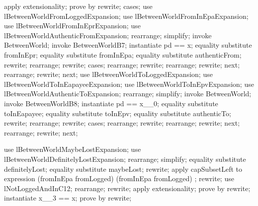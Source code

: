 \begin{LPScript}\begin{zproof}[lNotLoggedAndInC12]
    apply extensionality;
    prove by rewrite;
    cases;
        use lBetweenWorldFromLoggedExpansion;
        use lBetweenWorldFromInEpaExpansion;
        use lBetweenWorldFromInEprExpansion;
        use lBetweenWorldAuthenticFromExpansion;
        rearrange;
        simplify;
        invoke BetweenWorld;
        invoke BetweenWorldB7;
        instantiate pd == x;
        equality substitute fromInEpr;
        equality substitute fromInEpa;
        equality substitute authenticFrom;
        rewrite;
        rearrange;
        rewrite;
        cases;
            rearrange;
            rewrite;
            rearrange;
            rewrite;
        next;
            rearrange;
            rewrite;
    next;
        use lBetweenWorldToLoggedExpansion;
        use lBetweenWorldToInEapayeeExpansion;
        use lBetweenWorldToInEpvExpansion;
        use lBetweenWorldAuthenticToExpansion;
        rearrange;
        simplify;
        invoke BetweenWorld;
        invoke BetweenWorldB8;
        instantiate pd == x\_\_0;
        equality substitute toInEapayee;
        equality substitute toInEpv;
        equality substitute authenticTo;
        rewrite;
        rearrange;
        rewrite;
        cases;
            rearrange;
            rewrite;
            rearrange;
            rewrite;
        next;
            rearrange;
            rewrite;
    next;
\end{zproof}\end{LPScript}

\begin{LPScript}\begin{zproof}[lLostC13]
    use lBetweenWorldMaybeLostExpansion;
    use lBetweenWorldDefinitelyLostExpansion;
    rearrange;
    simplify;
    equality substitute definitelyLost;
    equality substitute maybeLost;
    rewrite;
    apply capSubsetLeft to expression (fromInEpa \cup fromLogged) \cap
        (fromInEpa \cup fromLogged) ;
    rewrite;
    use lNotLoggedAndInC12;
    rearrange;
    rewrite;
    apply extensionality;
    prove by rewrite;
    instantiate x\_\_3 == x;
    prove by rewrite;
\end{zproof}\end{LPScript}

